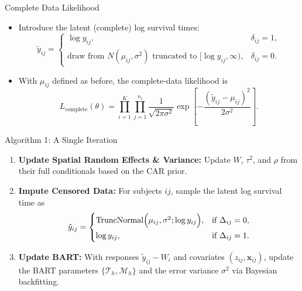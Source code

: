 \documentclass{beamer}
\begin{document}
\begin{frame}{Complete Data Likelihood}
  \begin{itemize}
    \item Introduce the latent (complete) log survival times:
      \[
      \tilde{y}_{ij} =
      \begin{cases}
        \log y_{ij}, & \delta_{ij}=1, \\[1ex]
        \text{draw from } N(\mu_{ij},\sigma^2) \text{ truncated to } [\log y_{ij},\infty), & \delta_{ij}=0.
      \end{cases}
      \]
    \item With \(\mu_{ij}\) defined as before, the complete-data likelihood is
      \[
      L_{\text{complete}}(\theta) = \prod_{i=1}^K \prod_{j=1}^{n_i} \frac{1}{\sqrt{2\pi\sigma^2}}
      \exp\!\left[-\frac{(\tilde{y}_{ij} - \mu_{ij})^2}{2\sigma^2}\right].
      \]
  \end{itemize}
\end{frame}


\begin{frame}{Algorithm 1: A Single Iteration}
  \begin{enumerate}
    \item \textbf{Update Spatial Random Effects \& Variance:} Update \(W\), \(\tau^2\), and \(\rho\) from their full conditionals based on the CAR prior.
    
    \item \textbf{Impute Censored Data:} For subjects $ij$, sample the latent log survival time as
      \[
      \tilde{y}_{ij} =
      \begin{cases}
        \operatorname{TruncNormal}\Bigl(\mu_{ij},\sigma^2;\log y_{ij}\Bigr), & \text{if } \Delta_{ij}=0, \\[1ex]
        \log y_{ij}, & \text{if } \Delta_{ij}=1.
      \end{cases}
      \]
    \item \textbf{Update BART:} With responses \(\tilde{y}_{ij} - W_i\) and covariates \((z_{ij},\mathbf{x}_{ij})\), update the BART parameters \(\{\mathcal{T}_h,\mathcal{M}_h\}\) and the error variance \(\sigma^2\) via Bayesian backfitting.
    
  \end{enumerate}
\end{frame}





 
\end{document}
